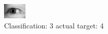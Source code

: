 \begin{figure}[h!]
\begin{center}
\includegraphics[width=0.60\columnwidth]{figures/ID3135_class_3_target_4.png}
\end{center}
\caption{ Classification: 3 actual target: 4}
\label{fig:ID3135_class_3_target_4}
\end{figure}
